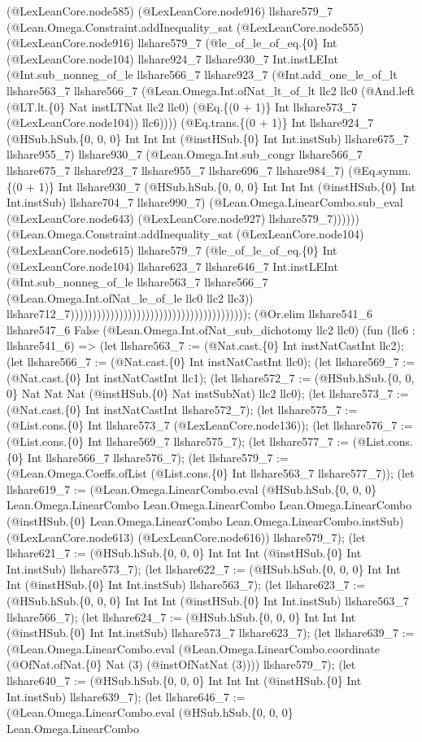 \documentclass[11pt]{article}
\begin{document}
(@LexLeanCore.node585) (@LexLeanCore.node916) llshare579\_7 (@Lean.Omega.Constraint.addInequality\_sat (@LexLeanCore.node555) (@LexLeanCore.node916) llshare579\_7 (@le\_of\_le\_of\_eq.\{0\} Int (@LexLeanCore.node104) llshare924\_7 llshare930\_7 Int.instLEInt (@Int.sub\_nonneg\_of\_le llshare566\_7 llshare923\_7 (@Int.add\_one\_le\_of\_lt llshare563\_7 llshare566\_7 (@Lean.Omega.Int.ofNat\_lt\_of\_lt llc2 llc0 (@And.left (@LT.lt.\{0\} Nat instLTNat llc2 llc0) (@Eq.\{(0 + 1)\} Int llshare573\_7 (@LexLeanCore.node104)) llc6)))) (@Eq.trans.\{(0 + 1)\} Int llshare924\_7 (@HSub.hSub.\{0, 0, 0\} Int Int Int (@instHSub.\{0\} Int Int.instSub) llshare675\_7 llshare955\_7) llshare930\_7 (@Lean.Omega.Int.sub\_congr llshare566\_7 llshare675\_7 llshare923\_7 llshare955\_7 llshare696\_7 llshare984\_7) (@Eq.symm.\{(0 + 1)\} Int llshare930\_7 (@HSub.hSub.\{0, 0, 0\} Int Int Int (@instHSub.\{0\} Int Int.instSub) llshare704\_7 llshare990\_7) (@Lean.Omega.LinearCombo.sub\_eval (@LexLeanCore.node643) (@LexLeanCore.node927) llshare579\_7)))))) (@Lean.Omega.Constraint.addInequality\_sat (@LexLeanCore.node104) (@LexLeanCore.node615) llshare579\_7 (@le\_of\_le\_of\_eq.\{0\} Int (@LexLeanCore.node104) llshare623\_7 llshare646\_7 Int.instLEInt (@Int.sub\_nonneg\_of\_le llshare563\_7 llshare566\_7 (@Lean.Omega.Int.ofNat\_le\_of\_le llc0 llc2 llc3)) llshare712\_7)))))))))))))))))))))))))))))))))))))))); (@Or.elim llshare541\_6 llshare547\_6 False (@Lean.Omega.Int.ofNat\_sub\_dichotomy llc2 llc0) (fun (llc6 : llshare541\_6) => (let llshare563\_7 := (@Nat.cast.\{0\} Int instNatCastInt llc2); (let llshare566\_7 := (@Nat.cast.\{0\} Int instNatCastInt llc0); (let llshare569\_7 := (@Nat.cast.\{0\} Int instNatCastInt llc1); (let llshare572\_7 := (@HSub.hSub.\{0, 0, 0\} Nat Nat Nat (@instHSub.\{0\} Nat instSubNat) llc2 llc0); (let llshare573\_7 := (@Nat.cast.\{0\} Int instNatCastInt llshare572\_7); (let llshare575\_7 := (@List.cons.\{0\} Int llshare573\_7 (@LexLeanCore.node136)); (let llshare576\_7 := (@List.cons.\{0\} Int llshare569\_7 llshare575\_7); (let llshare577\_7 := (@List.cons.\{0\} Int llshare566\_7 llshare576\_7); (let llshare579\_7 := (@Lean.Omega.Coeffs.ofList (@List.cons.\{0\} Int llshare563\_7 llshare577\_7)); (let llshare619\_7 := (@Lean.Omega.LinearCombo.eval (@HSub.hSub.\{0, 0, 0\} Lean.Omega.LinearCombo Lean.Omega.LinearCombo Lean.Omega.LinearCombo (@instHSub.\{0\} Lean.Omega.LinearCombo Lean.Omega.LinearCombo.instSub) (@LexLeanCore.node613) (@LexLeanCore.node616)) llshare579\_7); (let llshare621\_7 := (@HSub.hSub.\{0, 0, 0\} Int Int Int (@instHSub.\{0\} Int Int.instSub) llshare573\_7); (let llshare622\_7 := (@HSub.hSub.\{0, 0, 0\} Int Int Int (@instHSub.\{0\} Int Int.instSub) llshare563\_7); (let llshare623\_7 := (@HSub.hSub.\{0, 0, 0\} Int Int Int (@instHSub.\{0\} Int Int.instSub) llshare563\_7 llshare566\_7); (let llshare624\_7 := (@HSub.hSub.\{0, 0, 0\} Int Int Int (@instHSub.\{0\} Int Int.instSub) llshare573\_7 llshare623\_7); (let llshare639\_7 := (@Lean.Omega.LinearCombo.eval (@Lean.Omega.LinearCombo.coordinate (@OfNat.ofNat.\{0\} Nat (3) (@instOfNatNat (3)))) llshare579\_7); (let llshare640\_7 := (@HSub.hSub.\{0, 0, 0\} Int Int Int (@instHSub.\{0\} Int Int.instSub) llshare639\_7); (let llshare646\_7 := (@Lean.Omega.LinearCombo.eval (@HSub.hSub.\{0, 0, 0\} Lean.Omega.LinearCombo 
\end{document}
